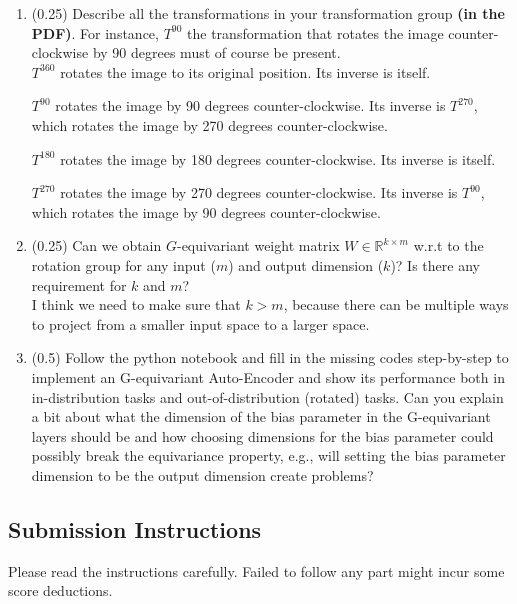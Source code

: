 \documentclass{article}
\begin{document}
\begin{enumerate}
    \item (0.25)  Describe all the transformations in your transformation group {\bf (in the PDF)}. For instance, $T^{90}$ the transformation that rotates the image counter-clockwise by 90 degrees must of course be present.\\

$T^{360}$ rotates the image to its original position. Its inverse is itself.

$T^{90}$ rotates the image by 90 degrees counter-clockwise. Its inverse is
$T^{270}$, which rotates the image by 270 degrees counter-clockwise.

$T^{180}$ rotates the image by 180 degrees counter-clockwise. Its inverse is itself.

$T^{270}$ rotates the image by 270 degrees counter-clockwise. Its inverse is
$T^{90}$, which rotates the image by 90 degrees counter-clockwise.

    \vspace{2in}
    \item (0.25)  Can we obtain $G$-equivariant weight matrix $W\in \mathbb{R}^{k\times m}$ w.r.t to the rotation group for any input ($m$) and output dimension ($k$)? Is there any requirement for $k$ and $m$?\\
    I think we need to make sure that $k > m$, because there can be multiple ways to project from a smaller input space to a larger space.
    \vspace{3in}
    \item (0.5) Follow the python notebook and fill in the missing codes step-by-step to implement an G-equivariant Auto-Encoder and show its performance both in in-distribution tasks and out-of-distribution (rotated) tasks. Can you explain a bit about what the dimension of the bias parameter in the G-equivariant layers should be and how choosing dimensions for the bias parameter could possibly break the equivariance property, e.g., will setting the bias parameter dimension to be the output dimension create problems?
    
\end{enumerate}
\newpage
\subsection*{Submission Instructions}

Please read the instructions carefully. Failed to follow any part might incur some score deductions.
\end{document}
